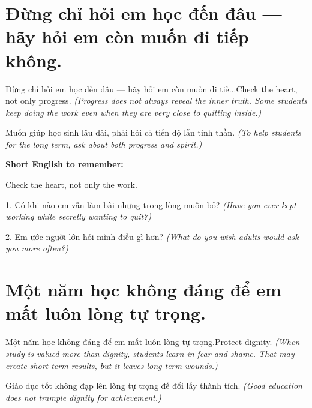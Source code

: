 \section{Đừng chỉ hỏi em học đến đâu — hãy hỏi em còn muốn đi tiếp không.}
\begin{truyen}{Đừng chỉ hỏi em học đến đâu — hãy hỏi em còn muốn đi tiế...}{Check the heart, not only progress.}
\textit{(Progress does not always reveal the inner truth. Some students keep doing the work even when they are very close to quitting inside.)}
\end{truyen}

\begin{baihoc}
Muốn giúp học sinh lâu dài, phải hỏi cả tiến độ lẫn tinh thần.
\textit{(To help students for the long term, ask about both progress and spirit.)}
\end{baihoc}

\begin{ghinhoanh}
\textbf{Short English to remember:}

Check the heart, not only the work.

\end{ghinhoanh}

\begin{tuhocnhanh}
1. Có khi nào em vẫn làm bài nhưng trong lòng muốn bỏ? \textit{(Have you ever kept working while secretly wanting to quit?)}

2. Em ước người lớn hỏi mình điều gì hơn? \textit{(What do you wish adults would ask you more often?)}
\end{tuhocnhanh}
\ngancach


\section{Một năm học không đáng để em mất luôn lòng tự trọng.}
\begin{truyen}{Một năm học không đáng để em mất luôn lòng tự trọng.}{Protect dignity.}
\textit{(When study is valued more than dignity, students learn in fear and shame. That may create short-term results, but it leaves long-term wounds.)}
\end{truyen}

\begin{baihoc}
Giáo dục tốt không đạp lên lòng tự trọng để đổi lấy thành tích.
\textit{(Good education does not trample dignity for achievement.)}
\end{baihoc}

